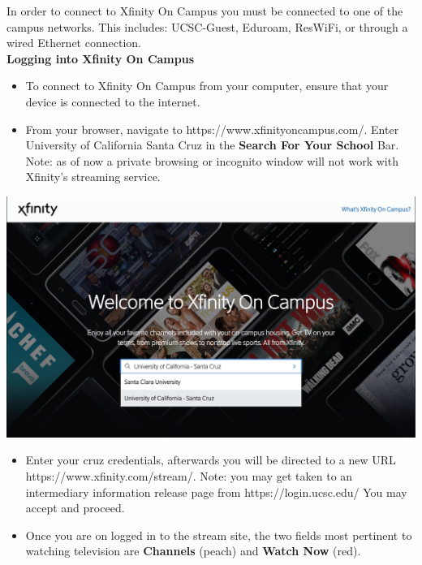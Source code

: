 \documentclass[a4paper, 11pt]{article}
\begin{document}
In order to connect to Xfinity On Campus you must be connected to one of the
campus networks.  This includes: UCSC-Guest, Eduroam, ResWiFi, or through a 
wired Ethernet connection.\\
{\newline}
\textbf{Logging into Xfinity On Campus}
\begin{itemize}
  \item To connect to Xfinity On Campus from your computer, ensure that your device  is connected to the internet. 
  \item From your browser, navigate to https://www.xfinityoncampus.com/.  Enter University of California Santa Cruz in the 
  \textbf{Search For Your School} Bar.
  Note: as of now a private browsing or incognito window will not work with
  Xfinity's streaming service.
\end{itemize}
\includegraphics[width=\linewidth, height=\textheight, keepaspectratio]{welcome.png}
\begin{itemize}
  \item Enter your cruz credentials, afterwards you will be directed to a new URL \\
  https://www.xfinity.com/stream/.  Note: you may get taken to an intermediary
  information release page from 
  https://login.ucsc.edu/  You may  accept and proceed.

  \item Once you are on logged in to the stream site, the two fields most
  pertinent to watching television are \textbf{Channels} (peach) and 
  \textbf{Watch Now}
  (red).
\end{itemize}
\end{document}
